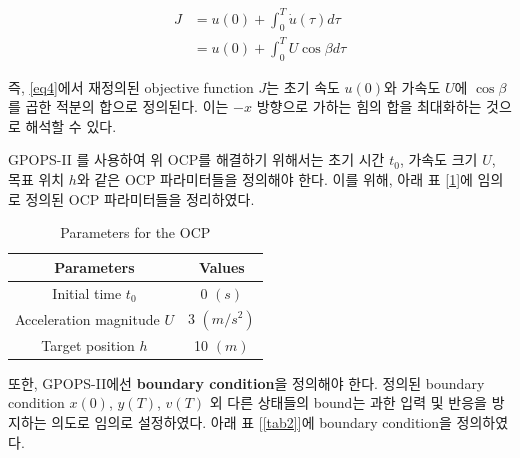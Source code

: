 \begin{equation}\label{eq4}
	\begin{aligned}
		J & = u(0) + \int_{0}^T \dot{u}(\tau) d\tau \\
		  & = u(0) + \int_{0}^T U \cos\beta d\tau
	\end{aligned}
\end{equation}

즉, \eqref{eq4}에서 재정의된 objective function $J$는 초기 속도 $u(0)$와 가속도 $U$에 $\cos \beta$를 곱한 적분의 합으로 정의된다.
이는 $-x$ 방향으로 가하는 힘의 합을 최대화하는 것으로 해석할 수 있다.

GPOPS-II \citep{patterson2014general}를 사용하여 위 OCP를 해결하기 위해서는 초기 시간 $t_0$, 가속도 크기 $U$, 목표 위치 $h$와 같은 OCP 파라미터들을 정의해야 한다.
이를 위해, 아래 표 [\ref{tab1}]에 임의로 정의된 OCP 파라미터들을 정리하였다.

\begin{table}[H]
	\begin{tabular}{|c|c|}
		\hline
		\textbf{Parameters}        & \textbf{Values} \\
		\hline
		Initial time $t_0$         & 0 $(s)$         \\
		\hline
		Acceleration magnitude $U$ & 3 $(m/s^2)$     \\
		\hline
		Target position $h$        & 10 $(m)$        \\
		\hline
	\end{tabular}
	\centering
	\caption{Parameters for the OCP}
	\label{tab1}
\end{table}

또한, GPOPS-II에선 \textbf{boundary condition}을 정의해야 한다.
정의된 boundary condition $x(0)$, $y(T)$, $v(T)$ 외 다른 상태들의 bound는 과한 입력 및 반응을 방지하는 의도로 임의로 설정하였다.
아래 표 [\ref{tab2}]에 boundary condition을 정의하였다.

